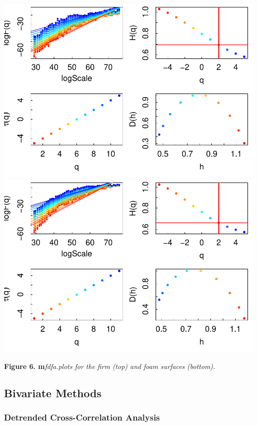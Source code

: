 \documentclass[
  man]{apa6}
\begin{document}
\includegraphics{fractal_regression_paper_brm_files/figure-latex/unnamed-chunk-13-1.pdf} \includegraphics{fractal_regression_paper_brm_files/figure-latex/unnamed-chunk-13-2.pdf}

\textbf{Figure 6. m}\emph{fdfa.plots for the firm (top) and foam surfaces
(bottom).}

\hypertarget{bivariate-methods}{%
\subsection{Bivariate Methods}\label{bivariate-methods}}

\hypertarget{detrended-cross-correlation-analysis}{%
\subsubsection{Detrended Cross-Correlation Analysis}\label{detrended-cross-correlation-analysis}}
\end{document}
